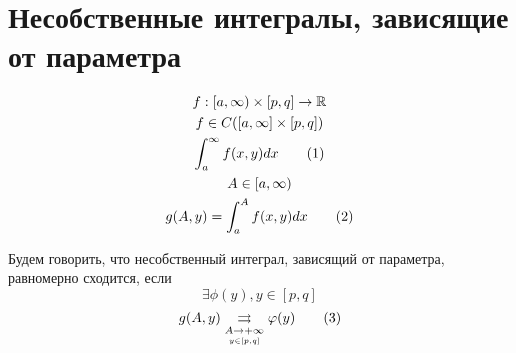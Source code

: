 \documentclass[main]{subfiles}
\begin{document}
     \section{Несобственные интегралы, зависящие от параметра}
     \begin{definition}
          \begin{gather*}
               f: [a, \infty) \times [p,q] \rightarrow \mathbb{R} \\
               f \in C([a,\infty] \times [p,q]) \\
               \int^\infty_a f(x,y) dx \tag{1} \\
               A \in [a,\infty) \\
               g(A,y) = \int^A_a f(x,y) dx \tag{2}
          \end{gather*}
     \end{definition}
     \begin{definition}
          Будем говорить, что несобственный интеграл, зависящий от параметра, равномерно сходится, если
          \[ \exists \phi(y), y \in [p,q] \]
          \[ g(A,y) \underset{\underset{y \in [p,q]}{A \to + \infty}}{\rightrightarrows} \varphi(y) \tag{3} \]
     \end{definition}
\end{document}
